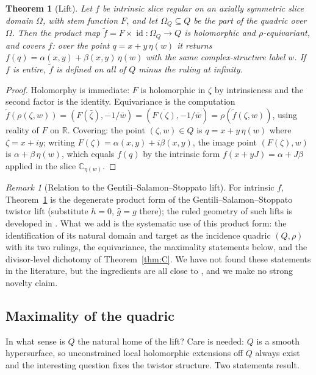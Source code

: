 \documentclass[11pt]{amsart}
\theoremstyle{plain}
\newtheorem{mainthm}{Theorem}
\theoremstyle{definition}
\theoremstyle{remark}
\newtheorem{remark}[theorem]{Remark}
\newcommand{\CC}{\mathbb{C}}
\newcommand{\RR}{\mathbb{R}}
\newcommand{\id}{\operatorname{id}}
\begin{document}
\begin{mainthm}[Lift]\label{thm:B}
Let $f$ be intrinsic slice regular on an axially symmetric slice domain $\Omega$, with stem
function $F$, and let $\Omega_Q\subseteq Q$ be the part of the quadric over $\Omega$. Then the
product map $\tilde f=F\times\id:\Omega_Q\to Q$ is holomorphic and $\rho$-equivariant, and
covers $f$: over the point $q=x+y\,\eta(w)$ it returns
$f(q)=\alpha(x,y)+\beta(x,y)\,\eta(w)$ with the same complex-structure label $w$. If $f$ is
entire, $\tilde f$ is defined on all of $Q$ minus the ruling at infinity.
\end{mainthm}

\begin{proof}
Holomorphy is immediate: $F$ is holomorphic in $\zeta$ by intrinsicness and the second factor is
the identity. Equivariance is the computation
$\tilde f(\rho(\zeta,w))=(F(\bar\zeta),-1/\bar w)=(\overline{F(\zeta)},-1/\bar w)
=\rho(\tilde f(\zeta,w))$, using reality of $F$ on $\RR$. Covering: the point $(\zeta,w)\in Q$ is
$q=x+y\,\eta(w)$ where $\zeta=x+iy$; writing $F(\zeta)=\alpha(x,y)+i\beta(x,y)$, the image point
$(F(\zeta),w)$ is $\alpha+\beta\,\eta(w)$, which equals $f(q)$ by the intrinsic form
$f(x+yJ)=\alpha+J\beta$ applied in the slice $\CC_{\eta(w)}$.
\end{proof}

\begin{remark}[Relation to the Gentili--Salamon--Stoppato lift]\label{rem:GSS}
For intrinsic $f$, Theorem~\ref{thm:B} is the degenerate product form of the
Gentili--Salamon--Stoppato twistor lift \cite[Thm.~5.3 and eq.~(5.6)]{GSS2014} (substitute
$h=0$, $\hat g=g$ there); the ruled geometry of such lifts is developed in
\cite{Altavilla2018,AltavillaSarfatti2019}. What we add is the systematic use of this product
form: the identification of its natural domain and target as the incidence quadric $(Q,\rho)$
with its two rulings, the equivariance, the maximality statements below, and the divisor-level
dichotomy of Theorem~\ref{thm:C}. We have not found these statements in the literature, but the
ingredients are all close to \cite{GSS2014,Altavilla2018,AltavillaSarfatti2019}, and we make no
strong novelty claim.
\end{remark}

\subsection*{Maximality of the quadric}
In what sense is $Q$ the natural home of the lift? Care is needed: $Q$ is a smooth hypersurface,
so unconstrained local holomorphic extensions off $Q$ always exist and the interesting question
fixes the twistor structure. Two statements result.
\end{document}
